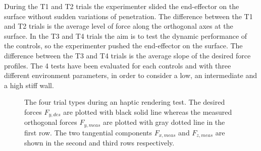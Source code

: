 During the T1 and T2 trials the experimenter slided the end-effector on the surface without sudden variations of penetration. The difference between the T1 and T2 trials is the average level of force along the orthogonal axes at the surface.
In the T3 and T4 trials the aim is to test the dynamic performance of the controls, so the experimenter pushed the end-effector on the surface. The difference between the T3 and T4 trials is the average slope of the desired force profiles.
The 4 tests have been evaluated for each controls and with three different environment parameters, in order to consider a low, an intermediate and a high stiff wall. 
\begin{figure}[htb]
	\centering
\def\svgwidth{1\columnwidth}
	\begin{footnotesize}
		
	\end{footnotesize}
	\caption{The four trial types during an haptic rendering test. The desired forces $F_{y,des}$ are plotted with black solid line whereas the measured orthogonal forces $F_{y,meas}$ are plotted with gray dotted line in the first row. The two tangential components  $F_{x,meas}$ and $F_{z,meas}$ are shown in the second and third rows  respectively.}
	\label{fig:renderingTestType}
\end{figure}

